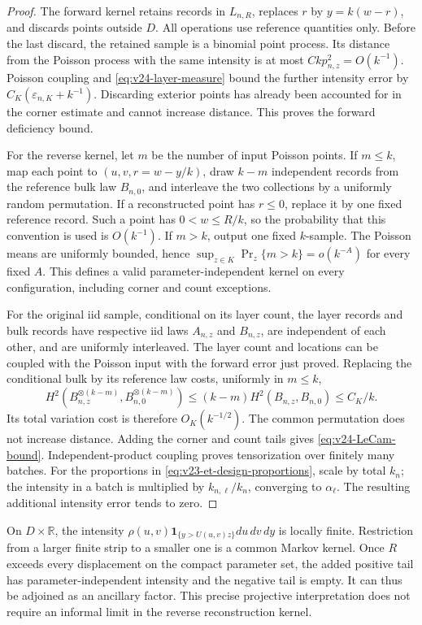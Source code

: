\begin{proof}
The forward kernel retains records in \(L_{n,R}\), replaces \(r\) by
\(y=k(w-r)\), and discards points outside \(D\).  All operations use
reference quantities only.  Before the last discard, the retained sample
is a binomial point process.  Its distance from the Poisson process with
the same intensity is at most \(Ckp_{n,z}^2=O(k^{-1})\).  Poisson coupling
and \eqref{eq:v24-layer-measure} bound the further intensity error by
\(C_K(\varepsilon_{n,K}+k^{-1})\).  Discarding exterior points has already
been accounted for in the corner estimate and cannot increase distance.
This proves the forward deficiency bound.

For the reverse kernel, let \(m\) be the number of input Poisson points.
If \(m\le k\), map each point to \((u,v,r=w-y/k)\), draw \(k-m\)
independent records from the reference bulk law \(B_{n,0}\), and interleave
the two collections by a uniformly random permutation.  If a reconstructed
point has \(r\le0\), replace it by one fixed reference record.  Such a
point has \(0<w\le R/k\), so the probability that this convention is
used is \(O(k^{-1})\).  If \(m>k\), output one fixed \(k\)-sample.
The Poisson means are uniformly bounded, hence
\(\sup_{z\in K}\Pr_z\{m>k\}=o(k^{-A})\) for every fixed \(A\).
This defines a valid parameter-independent kernel on every configuration,
including corner and count exceptions.

For the original iid sample, conditional on its layer count, the layer
records and bulk records have respective iid laws \(A_{n,z}\) and
\(B_{n,z}\), are independent of each other, and are uniformly interleaved.
The layer count and locations can be coupled with the Poisson input with
the forward error just proved.  Replacing the conditional bulk by its
reference law costs, uniformly in \(m\le k\),
\[
 H^2(B_{n,z}^{\otimes(k-m)},B_{n,0}^{\otimes(k-m)})
       \le(k-m)H^2(B_{n,z},B_{n,0})\le C_K/k.
\]
Its total variation cost is therefore \(O_K(k^{-1/2})\).  The common
permutation does not increase distance.  Adding the corner and count tails
gives \eqref{eq:v24-LeCam-bound}.  Independent-product coupling proves
tensorization over finitely many batches.  For the proportions in
\eqref{eq:v23-et-design-proportions}, scale by total \(k_n\); the intensity
in a batch is multiplied by \(k_{n,\ell}/k_n\), converging to
\(\alpha_\ell\).  The resulting additional intensity error tends to zero.
\end{proof}

\begin{remark}
\label{rem:v24-projective-poisson}
On \(D\times\mathbb R\), the intensity
\(\rho(u,v)\mathbf1_{\{y>U(u,v)z\}}du\,dv\,dy\) is locally finite.
Restriction from a larger finite strip to a smaller one is a common Markov
kernel.  Once \(R\) exceeds every displacement on the compact parameter
set, the added positive tail has parameter-independent intensity and the
negative tail is empty.  It can thus be adjoined as an ancillary factor.
This precise projective interpretation does not require an informal limit
in the reverse reconstruction kernel.
\end{remark}
